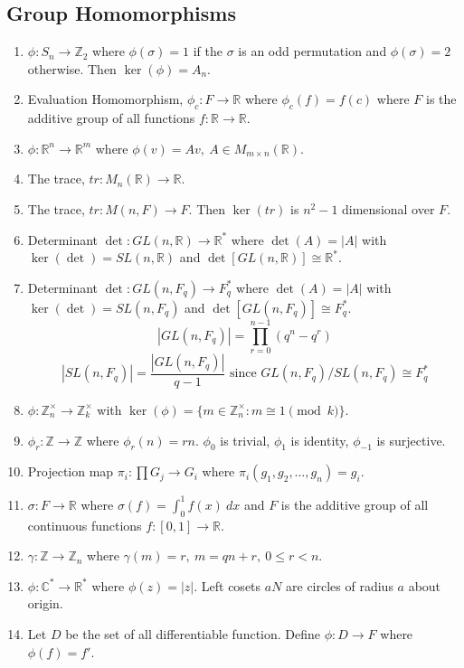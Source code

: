 \subsection{Group Homomorphisms}
\begin{enumerate}
	\item $\phi : S_n \to \mathbb{Z}_2$ where $\phi(\sigma) = 1$ if the $\sigma$ is an odd permutation and $\phi(\sigma) = 2$ otherwise. Then $\ker(\phi)=A_n$.
	\item Evaluation Homomorphism, $\phi_c : F \to \mathbb{R}$ where $\phi_c(f) = f(c)$ where $F$ is the additive group of all functions $f : \mathbb{R} \to \mathbb{R}$.
	\item $\phi : \mathbb{R}^n \to \mathbb{R}^m$ where $\phi(v) = Av,\ A \in M_{m \times n}(\mathbb{R})$.
	\item The trace, $tr : M_n(\mathbb{R}) \to \mathbb{R}$.
	\item The trace, $tr : M(n,F) \to F$. Then $\ker(tr)$ is $n^2-1$ dimensional over $F$.
	\item Determinant $\det : GL(n,\mathbb{R}) \to \mathbb{R}^\ast$ where $\det(A)=|A|$ with $\ker(\det) = SL(n,\mathbb{R})$ and $\det[GL(n,\mathbb{R})] \cong \mathbb{R}^\ast$.
	\item Determinant $\det : GL(n,F_q) \to F_q^\ast$ where $\det(A)=|A|$ with $\ker(\det) = SL(n,F_q)$ and $\det[GL(n,F_q)] \cong F_q^\ast$.
	$$|GL(n,F_q)| = \prod_{r=0}^{n-1} (q^n-q^r)$$
	$$|SL(n,F_q)| = \frac{|GL(n,F_q)|}{q-1} \text{ since } GL(n,F_q)/SL(n,F_q) \cong F_q^\ast$$
	\item $\phi : \mathbb{Z}_n^\times \to \mathbb{Z}_k^\times$ with $\ker(\phi) = \{ m \in \mathbb{Z}_n^\times : m \cong 1 \pmod{k} \}$.
	\item $\phi_r : \mathbb{Z} \to \mathbb{Z}$ where $\phi_r(n) = rn$. $\phi_0$ is trivial, $\phi_1$ is identity, $\phi_{-1}$ is surjective.
	\item Projection map $\pi_i : \prod G_j \to G_i$ where $\pi_i(g_1,g_2,\dots,g_n) = g_i$.
	\item $\sigma : F \to \mathbb{R}$ where $\sigma(f) = \int_0^1 f(x)\ dx$ and $F$ is the additive group of all continuous functions $f : [0,1] \to \mathbb{R}$.
	\item $\gamma : \mathbb{Z} \to \mathbb{Z}_n$ where $\gamma(m) = r,\ m =qn+r,\ 0 \le r < n$.
	\item $\phi : \mathbb{C}^\ast \to \mathbb{R}^\ast$ where $\phi(z) = |z|$.
	Left cosets $aN$ are circles of radius $a$ about origin.
	\item Let $D$ be the set of all differentiable function. Define $\phi : D \to F$ where $\phi(f) = f'$.

\end{enumerate}
